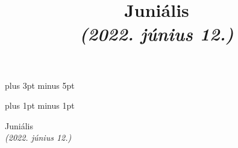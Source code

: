 \documentclass[a5paper,twoside]{article}
\title{Juniális\\\textit{(2022. június 12.)}}
\date{}
\renewcommand{\_}[1]{\underline{#1}} %
\begin{document}


  \versesep=12pt plus 3pt minus 5pt

  \iflyric
    \baselineadj=2pt plus 1pt minus 1pt
  \fi

  \begin{center}
    \vspace*{2cm}
    {\huge Juniális} \\
    \vspace*{0.2cm}
    {\Large \textit{(2022. június 12.)}}
    \vspace{3cm}
  \end{center}
  \vspace{-0.25cm}

  \vspace{-0.25cm}

\end{document}
